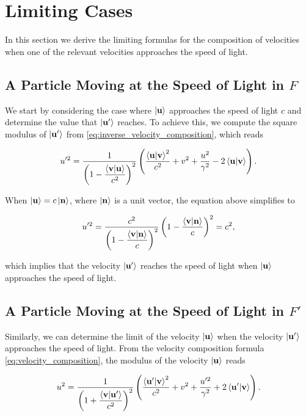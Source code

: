 \documentclass[12pt]{article}
\begin{document}
\section{Limiting Cases}

In this section we derive the limiting formulas for the composition of velocities when one
of the relevant velocities approaches the speed of light.

\subsection{A Particle Moving at the Speed of Light in $F$}

We start by considering the case where $\ket{\vb{u}}$ approaches the speed of light
$c$ and determine the value that $\ket{\vb{u}'}$ reaches. To achieve this, we compute
the square modulus of $\ket{\vb{u}'}$ from \eqref{eq:inverse_velocity_composition},
which reads

\[
  u'^2
  =
  \frac{1}{
    \displaystyle
    \left(
      1 - \frac{\ip{\vb{v}}{\vb{u}}}{c^2}
    \right)^2
  }
  \left(
    \frac{\ip{\vb{u}}{\vb{v}}^2}{c^2}
    + v^2
    + \frac{u^2}{\gamma^2}
    - 2\ip{\vb{u}}{\vb{v}}
  \right).
\]

When $\ket{\vb{u}} = c\ket{\vb{n}}$, where $\ket{\vb{n}}$ is a unit vector, the equation
above simplifies to

\[
  u'^2
  =
  \frac{c^2}{
    \displaystyle
    \left(
      1 - \frac{\ip{\vb{v}}{\vb{n}}}{c}
    \right)^2
  }
  \left(
    1 - \frac{\ip{\vb{v}}{\vb{n}}}{c}
  \right)^2
  =
  c^2,
\]

which implies that the velocity $\ket{\vb{u}'}$ reaches the speed of light when
$\ket{\vb{u}}$ approaches the speed of light.

\subsection{A Particle Moving at the Speed of Light in $F'$}

Similarly, we can determine the limit of the velocity $\ket{\vb{u}}$ when the velocity
$\ket{\vb{u}'}$ approaches the speed of light. From the velocity composition formula
\eqref{eq:velocity_composition}, the modulus of the velocity $\ket{\vb{u}}$ reads

\[
  u^2
  =
  \frac{1}{
    \displaystyle
    \left(
      1 + \frac{\ip{\vb{v}}{\vb{u}'}}{c^2}
    \right)^2
  }
  \left(
    \frac{\ip{\vb{u}'}{\vb{v}}^2}{c^2}
    + v^2
    + \frac{u'^2}{\gamma^2}
    + 2\ip{\vb{u}'}{\vb{v}}
  \right).
\]
\end{document}
